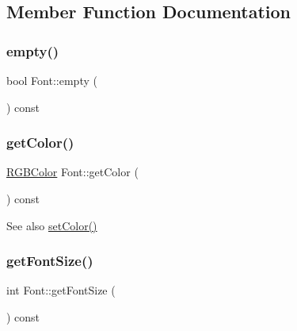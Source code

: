 \subsection{Member Function Documentation}
\mbox{\label{class_font_add8908307abd40c4855c265582dad897}} 
\subsubsection{\texorpdfstring{empty()}{empty()}}
{\footnotesize\ttfamily bool Font\+::empty (\begin{DoxyParamCaption}{ }\end{DoxyParamCaption}) const}

\mbox{\label{class_font_a1a8880f99db17a98294d9bfb8d5b6a25}} 
\subsubsection{\texorpdfstring{get\+Color()}{getColor()}}
{\footnotesize\ttfamily \mbox{\hyperlink{class_r_g_b_color}{R\+G\+B\+Color}} Font\+::get\+Color (\begin{DoxyParamCaption}{ }\end{DoxyParamCaption}) const}

\begin{DoxySeeAlso}{See also}
\mbox{\hyperlink{class_font_af7bbc373536b3193fdee4c56e61f2463}{set\+Color()}} 
\end{DoxySeeAlso}
\mbox{\label{class_font_a18fa6855561c84d79cea757128aabd08}} 
\subsubsection{\texorpdfstring{get\+Font\+Size()}{getFontSize()}}
{\footnotesize\ttfamily int Font\+::get\+Font\+Size (\begin{DoxyParamCaption}{ }\end{DoxyParamCaption}) const}

\mbox{\label{class_font_a2a6d1fe37cc96a265144c958f5492676}} 
